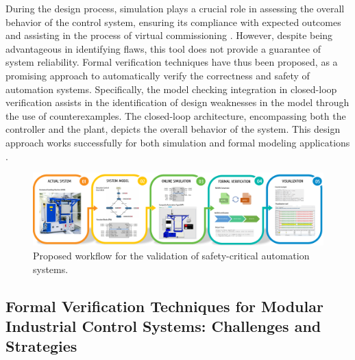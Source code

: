 \documentclass{ieeeojies}
\begin{document}
During the design process, simulation plays a crucial role in assessing the overall behavior of the control system, ensuring its compliance with expected outcomes and assisting in the process of virtual commissioning \cite{galkin2023automatic}. However, despite being advantageous in identifying flaws, this tool does not provide a guarantee of system reliability. 
Formal verification techniques have thus been proposed, as a promising approach to automatically verify the correctness and safety of automation systems.
Specifically, the model checking integration in closed-loop verification \cite{xavier2023formal} assists in the identification of design weaknesses in the model through the use of counterexamples. The closed-loop architecture, encompassing both the controller and the plant, depicts the overall behavior of the system. This design approach works successfully for both simulation and formal modeling applications \cite{sinha2019survey}. 

\begin{figure}
    \centering
    \includegraphics[width=\textwidth]{pictures/lilli02.pdf}
    \caption{Proposed workflow for the validation of safety-critical automation systems.} 
    \label{fig:workflow}
\end{figure}

\subsection{Formal Verification Techniques for  Modular Industrial Control Systems: Challenges and Strategies}
\end{document}
